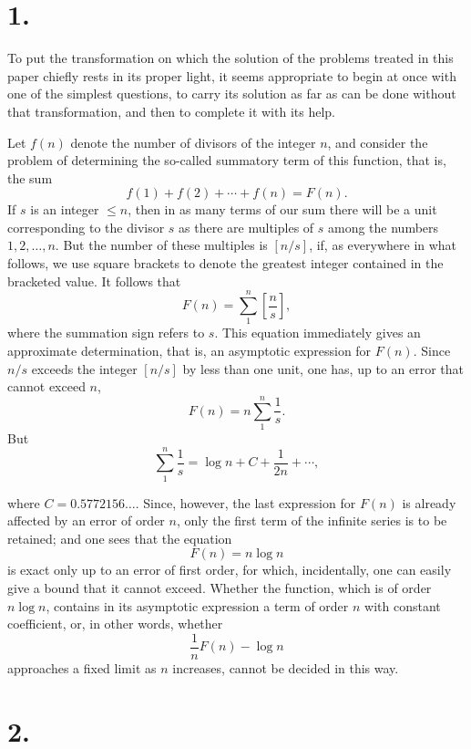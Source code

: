 \documentclass[11pt]{article}
\newcommand{\floor}[1]{\left[#1\right]}
\begin{document}
\section*{1.}

To put the transformation on which the solution of the problems treated in this paper chiefly rests in its proper light, it seems appropriate to begin at once with one of the simplest questions, to carry its solution as far as can be done without that transformation, and then to complete it with its help.

Let $f(n)$ denote the number of divisors of the integer $n$, and consider the problem of determining the so-called summatory term of this function, that is, the sum
\[
 f(1)+f(2)+\cdots+f(n)=F(n).
\]
If $s$ is an integer $\leq n$, then in as many terms of our sum there will be a unit corresponding to the divisor $s$ as there are multiples of $s$ among the numbers $1,2,\ldots,n$. But the number of these multiples is $\floor{n/s}$, if, as everywhere in what follows, we use square brackets to denote the greatest integer contained in the bracketed value. It follows that
\[
 F(n)=\sum_{1}^{n}\floor{\frac ns},
\]
where the summation sign refers to $s$. This equation immediately gives an approximate determination, that is, an asymptotic expression for $F(n)$. Since $n/s$ exceeds the integer $\floor{n/s}$ by less than one unit, one has, up to an error that cannot exceed $n$,
\[
 F(n)=n\sum_{1}^{n}\frac1s.
\]
But
\[
 \sum_{1}^{n}\frac1s=\log n+C+\frac1{2n}+\cdots,
\]

where $C=0.5772156\ldots$. Since, however, the last expression for $F(n)$ is already affected by an error of order $n$, only the first term of the infinite series is to be retained; and one sees that the equation
\[
 F(n)=n\log n
\]
is exact only up to an error of first order, for which, incidentally, one can easily give a bound that it cannot exceed. Whether the function, which is of order $n\log n$, contains in its asymptotic expression a term of order $n$ with constant coefficient, or, in other words, whether
\[
 \frac1nF(n)-\log n
\]
approaches a fixed limit as $n$ increases, cannot be decided in this way.

\section*{2.}
\end{document}
